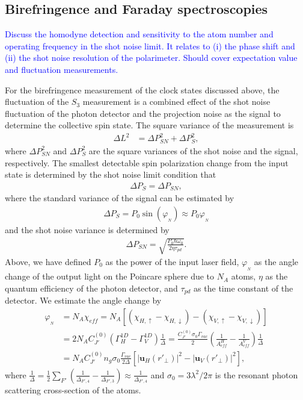 \documentclass[preprint,aps,pra,onecolumn]{revtex4-1} %
\begin{document}
\subsection{Birefringence and Faraday spectroscopies}

\textcolor{blue}{Discuss the homodyne detection and sensitivity to the atom number and operating frequency in the shot noise limit.  It relates to (i) the phase shift and (ii) the shot noise resolution of the polarimeter. Should cover expectation value and fluctuation measurements.}

For the birefringence measurement of the clock states discussed above, the fluctuation of the $ S_3 $ measurement is a combined effect of the shot noise fluctuation of the photon detector and the projection noise as the signal to determine the collective spin state. The square variance of the measurement is
\begin{align}
\Delta L^2 &= \Delta P^2_{SN} + \Delta P^2_S ,
\end{align}
where $ \Delta P^2_{SN} $ and $ \Delta P^2_{S} $ are the square variances of the shot noise and the signal, respectively. 
The smallest detectable spin polarization change from the input state is determined by the shot noise limit condition that 
\begin{align}
\Delta P_S = \Delta P_{SN},
\end{align}
where the standard variance of the signal can be estimated by
\begin{align}
\Delta P_S=P_0 \sin(\varphi_{_N}) \approx P_0 \varphi_{_N}
\end{align}
and the shot noise variance is determined by~\cite{Smith2003a}
\begin{align}
\Delta P_{SN} = \sqrt{\frac{P_0 \hbar \omega_0 }{2\eta \tau_{pd}}}.
\end{align}
Above, we have defined $P_0$ as the power of the input laser field, $\varphi_{_N}$ as the angle change of the output light on the Poincare sphere due to $N_A$ atoms, $\eta$ as the quantum efficiency of the photon detector, and $\tau_{pd}$ as the time constant of the detector. 
We estimate the angle change by
\begin{align}
\varphi_{_N} &= N_A \chi_{e\!f\!f}=N_A [(\chi_{H,\uparrow}-\chi_{H,\downarrow})-(\chi_{V,\uparrow}-\chi_{V,\downarrow})]\\
&= 2N_AC_{J'}^{(0)}(\Gamma_{H}^{1D}-\Gamma_V^{1D})\frac{1}{\Delta}=\frac{C_{J'}^{(0)}\sigma_0\Gamma_{vac}}{2}(\frac{1}{A^H_{e\!f\!f}}-\frac{1}{A^V_{e\!f\!f}})\frac{1}{\Delta}\\
&=N_AC_{J'}^{(0)}n_g\sigma_0\frac{\Gamma_{vac}}{2\Delta}\left[| \mathbf{u}_H(r'_{\!\perp})|^2- | \mathbf{u}_V(r'_{\!\perp})|^2 \right],
\end{align}
where $\frac{1}{\Delta}=\frac{1}{2}\sum_{F'}(\frac{1}{\Delta_{F',4}}-\frac{1}{\Delta_{F',3}})\approx \frac{1}{\Delta_{F',4}}$ and $ \sigma_0=3\lambda^2/2\pi $ is the resonant photon scattering cross-section of the atoms.
\end{document}
